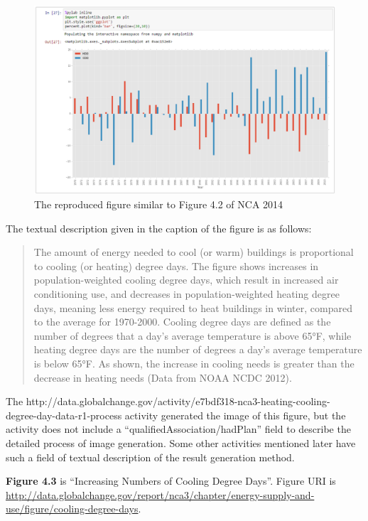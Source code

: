 \begin{figure}
	\includegraphics[width=\textwidth]{nca3image.png}
	\caption{The reproduced figure similar to Figure 4.2 of NCA 2014}
	\label{fig:nca3image}
\end{figure}

The textual description given in the caption of the figure is as follows:
\begin{quotation}
The amount of energy needed to cool (or warm) buildings is proportional to cooling (or heating) degree days. The figure shows increases in population-weighted cooling degree days, which result in increased air conditioning use, and decreases in population-weighted heating degree days, meaning less energy required to heat buildings in winter, compared to the average for 1970-2000. Cooling degree days are defined as the number of degrees that a day's average temperature is above 65°F, while heating degree days are the number of degrees a day’s average temperature is below 65°F. As shown, the increase in cooling needs is greater than the decrease in heating needs (Data from NOAA NCDC 2012).

\end{quotation}

The http://data.globalchange.gov/activity/e7bdf318-nca3-heating-cooling- degree-day-data-r1-process activity generated the image of this figure, but the activity does not include a ``qualifiedAssociation/hadPlan'' field to describe the detailed process of image generation. Some other activities mentioned later have such a field of textual description of the result generation method.

\textbf{Figure 4.3} is ``Increasing Numbers of Cooling Degree Days''. Figure URI is \url{http://data.globalchange.gov/report/nca3/chapter/energy-supply-and-use/figure/cooling-degree-days}.

